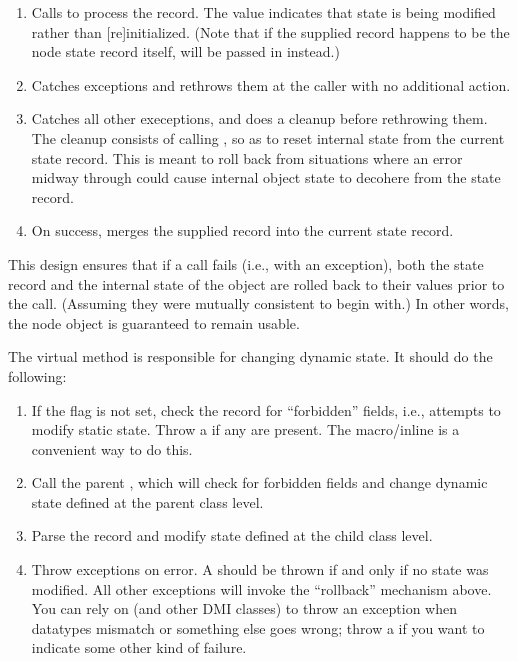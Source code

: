 \documentclass[10pt]{article}
\begin{document}
\begin{enumerate}

  \item Calls  to process the record. The
     value indicates that state is being modified rather than
    [re]initialized. (Note that if the supplied record happens to be the node
    state record itself,  will be passed in instead.)

  \item Catches  exceptions and rethrows them at
    the caller with no additional action.

  \item Catches all other execeptions, and does a cleanup before rethrowing
    them. The cleanup consists of calling , so
    as to reset internal state from the current state record. This is meant to
    roll back from situations where an error midway through 
    could cause internal object state to decohere from the state record.

  \item On success, merges the supplied record into the current state record.

\end{enumerate}

  This design ensures that if a  call fails (i.e., with an
  exception), both the state record and the internal state of the object are
  rolled back to their values prior to the call. (Assuming they were mutually
  consistent to begin with.) In other words, the node object is guaranteed to
  remain usable.

  The virtual  method is responsible for changing dynamic
  state. It should do the following:

\begin{enumerate}

  \item If the  flag is not set, check the record for
    ``forbidden'' fields, i.e., attempts to modify static state. Throw a
     if any are present. The
      macro/inline is a convenient way to
    do this.

  \item Call the parent , which will check for forbidden fields and 
    change dynamic state defined at the parent class level.
    
  \item Parse the record and modify state defined at the child class level.
    
  \item Throw exceptions on error. A  should be
    thrown if and only if no state was modified. All other exceptions will
    invoke the ``rollback'' mechanism above. You can rely on 
    (and other DMI classes) to throw an exception when datatypes mismatch or
    something else goes wrong; throw a  if you want
    to indicate some other kind of failure.

\end{enumerate}
\end{document}
